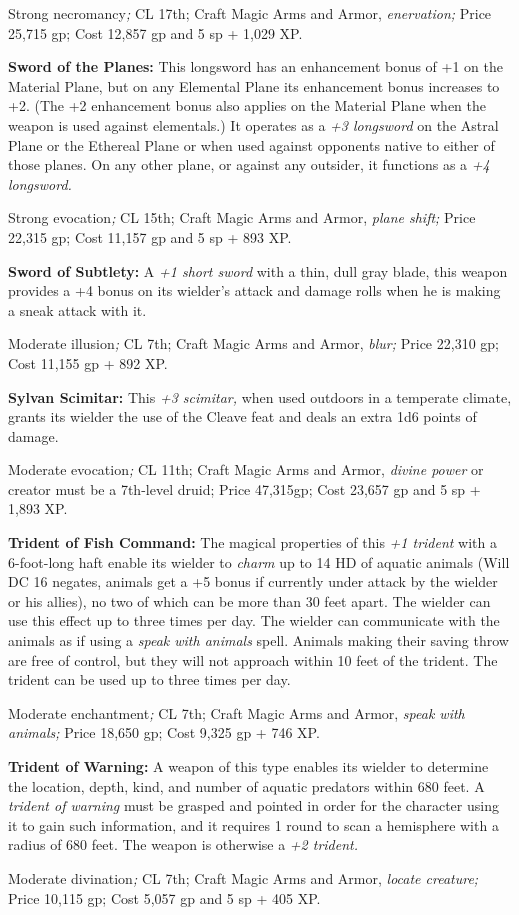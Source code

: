 Strong necromancy\textit{; }CL 17th; Craft Magic Arms and Armor, \textit{enervation; 
}Price 25,715 gp; Cost 12,857 gp and 5 sp + 1,029 XP.

\textbf{Sword of the Planes: }This longsword has an enhancement bonus of +1 on 
the Material Plane, but on any Elemental Plane its enhancement bonus increases 
to +2. (The +2 enhancement bonus also applies on the Material Plane when the weapon 
is used against elementals.) It operates as a \textit{+3 longsword }on the Astral 
Plane or the Ethereal Plane or when used against opponents native to either of 
those planes. On any other plane, or against any outsider, it functions as a \textit{+4 
longsword.}

Strong evocation\textit{; }CL 15th; Craft Magic Arms and Armor, \textit{plane shift; 
}Price 22,315 gp; Cost 11,157 gp and 5 sp + 893 XP.

\textbf{Sword of Subtlety:} A \textit{+1 short sword }with a thin, dull gray blade, 
this weapon provides a +4 bonus on its wielder's attack and damage rolls when he 
is making a sneak attack with it.

Moderate illusion\textit{; }CL 7th; Craft Magic Arms and Armor, \textit{blur; }Price 
22,310 gp; Cost 11,155 gp + 892 XP.

\textbf{Sylvan Scimitar:} This \textit{+3 scimitar, }when used outdoors in a temperate 
climate, grants its wielder the use of the Cleave feat and deals an extra 1d6 points 
of damage.

Moderate evocation\textit{; }CL 11th; Craft Magic Arms and Armor, \textit{divine 
power }or creator must be a 7th-level druid; Price 47,315gp; Cost 23,657 gp and 
5 sp + 1,893 XP.

\textbf{Trident of Fish Command:} The magical properties of this \textit{+1 trident 
}with a 6-foot-long haft enable its wielder to \textit{charm }up to 14 HD of aquatic 
animals (Will DC 16 negates, animals get a +5 bonus if currently under attack by 
the wielder or his allies), no two of which can be more than 30 feet apart. The 
wielder can use this effect up to three times per day. The wielder can communicate 
with the animals as if using a \textit{speak with animals }spell. Animals making 
their saving throw are free of control, but they will not approach within 10 feet 
of the trident. The trident can be used up to three times per day.

Moderate enchantment\textit{; }CL 7th; Craft Magic Arms and Armor, \textit{speak 
with animals; }Price 18,650 gp; Cost 9,325 gp + 746 XP.

\textbf{Trident of Warning:} A weapon of this type enables its wielder to determine 
the location, depth, kind, and number of aquatic predators within 680 feet. A \textit{trident 
of warning }must be grasped and pointed in order for the character using it to 
gain such information, and it requires 1 round to scan a hemisphere with a radius 
of 680 feet. The weapon is otherwise a \textit{+2 trident.}

Moderate divination\textit{; }CL 7th; Craft Magic Arms and Armor, \textit{locate 
creature; }Price 10,115 gp; Cost 5,057 gp and 5 sp + 405 XP.